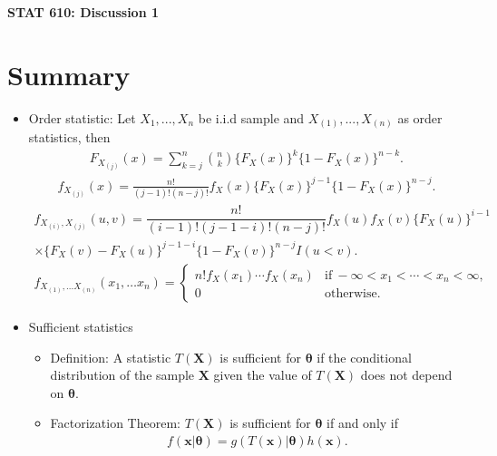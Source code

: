 \documentclass[12pt]{extarticle}
\newcommand{\X}{\mathbf X}
\begin{document}
\begin{center}
{\large \bf STAT 610: Discussion 1}
\end{center}
\vspace{0.22cm}

\section{Summary}
\begin{itemize}

		\item Order statistic: Let $X_1, ..., X_n$ be i.i.d sample and $X_{(1)}, ..., X_{(n)}$ as order statistics, then
	\begin{align*}
	F_{X_{(j)}}(x)=\sum_{k=j}^{n} \binom{n}{k}\{F_X(x)\}^k\{1-F_X(x)\}^{n-k}.
	\end{align*}
	\vspace{-8mm}
	\begin{align*}
	f_{X_{(j)}}(x)=\frac{n!}{(j-1)!(n-j)!}f_X(x) \{F_X(x)\}^{j-1}\{1-F_X(x)\}^{n-j}.
	\end{align*}
	\vspace{-8mm}
	\begin{align*}
	f_{X_{(i)},X_{(j)}}(u,v) = \dfrac{n!}{(i-1)!(j-1-i)!(n-j)!}f_X(u)f_X(v)\{F_X(u)\}^{i-1}\\ \times\{F_X(v) - F_X(u)\}^{j-1-i}\{1 - F_X(v)\}^{n-j}I(u<v).
	\end{align*}
	\vspace{-8mm}
	\begin{align*}
	f_{X_{(1)},\ldots X_{(n)}}(x_1,\ldots x_n) = 
	\begin{cases}
	n!f_X(x_1)\cdots f_X(x_n) & \text{if} \ -\infty < x_1 < \cdots < x_n < \infty,\\
	0 & \text{otherwise.}
	\end{cases}	
	\end{align*}


	\item Sufficient statistics
	\begin{itemize}
		\item Definition: A statistic $T(\X)$ is sufficient for $\bm\theta$ if the conditional distribution of the sample $\X$ given the value of $T(\X)$ does not depend on $\bm\theta$.
		\item Factorization Theorem: $T(\mathbf{X})$ is sufficient for $\bm\theta$ if and only if 
		\begin{align*}
		f(\mathbf{x}|\bm\theta)=g(T(\mathbf{x})|\bm\theta)h(\mathbf{x}).
		\end{align*}
	\end{itemize}
	

\end{itemize}
\end{document}

